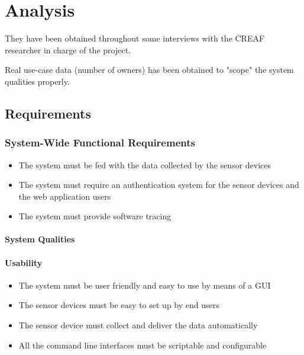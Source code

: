 \chapter{Analysis}

They have been obtained throughout some interviews with the CREAF researcher in charge of the project.

Real use-case data (number of owners) has been obtained to "scope" the system qualities properly.

\section{Requirements}

\subsection{System-Wide Functional Requirements}

\begin{itemize}
	\item The system must be fed with the data collected by the sensor devices
	\item The system must require an authentication system for the sensor devices and the web application users
	\item The system must provide software tracing
\end{itemize}

\subsubsection{System Qualities}

\subsubsection{Usability}

\begin{itemize}
	\item The system must be user friendly and easy to use by means of a GUI
	\item The sensor devices must be easy to set up by end users
	\item The sensor device must collect and deliver the data automatically
	\item All the command line interfaces must be scriptable and configurable
\end{itemize}


